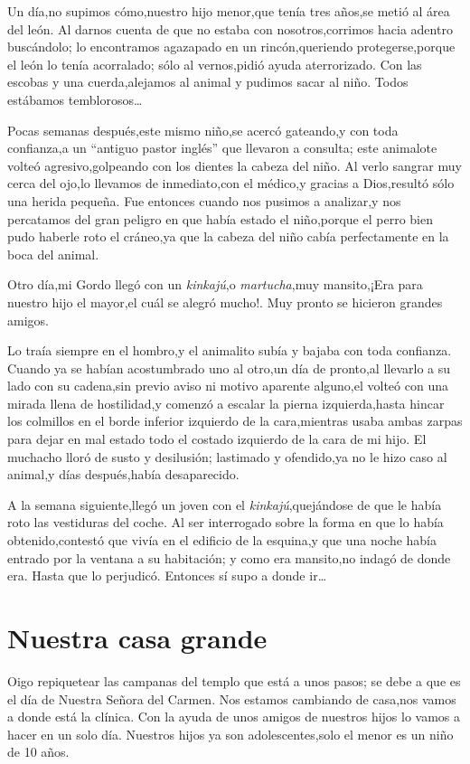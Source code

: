 \documentclass[letterpaper,12pt]{book}
\begin{document}
Un día,no supimos cómo,nuestro hijo menor,que tenía tres años,se metió al área del león. Al darnos cuenta de que no estaba con nosotros,corrimos hacia adentro buscándolo; lo encontramos agazapado en un rincón,queriendo protegerse,porque el león lo tenía acorralado; sólo al vernos,pidió ayuda aterrorizado. Con las escobas y una cuerda,alejamos al animal y pudimos sacar al niño. Todos estábamos temblorosos\ldots

Pocas semanas después,este mismo niño,se acercó gateando,y con toda confianza,a un ``antiguo pastor inglés'' que llevaron a consulta; este animalote volteó agresivo,golpeando con los dientes la cabeza del niño. Al verlo sangrar muy cerca del ojo,lo llevamos de inmediato,con el médico,y gracias a Dios,resultó sólo una herida pequeña. Fue entonces cuando nos pusimos a analizar,y nos percatamos del gran peligro en que había estado el niño,porque el perro bien pudo haberle roto el cráneo,ya que la cabeza del niño cabía perfectamente en la boca del animal.

Otro día,mi Gordo llegó con un \textit{kinkajú},o \textit{martucha},muy mansito,¡Era para nuestro hijo el mayor,el cuál se alegró mucho!. Muy pronto se hicieron grandes amigos.

Lo traía siempre en el hombro,y el animalito subía y bajaba con toda confianza. Cuando ya se habían acostumbrado uno al otro,un día de pronto,al llevarlo a su lado con su cadena,sin previo aviso ni motivo aparente alguno,el volteó con una mirada llena de hostilidad,y comenzó a escalar la pierna izquierda,hasta hincar los colmillos en el borde inferior izquierdo de la cara,mientras usaba ambas zarpas para dejar en mal estado todo el costado izquierdo de la cara de mi hijo. El muchacho lloró de susto y desilusión; lastimado y ofendido,ya no le hizo caso al animal,y días después,había desaparecido.

A la semana siguiente,llegó un joven con el \textit{kinkajú},quejándose de que le había roto las vestiduras del coche. Al ser interrogado sobre la forma en que lo había obtenido,contestó que vivía en el edificio de la esquina,y que una noche había entrado por la ventana a su habitación; y como era mansito,no indagó de donde era. Hasta que lo perjudicó. Entonces sí supo a donde ir\ldots

\chapter{Nuestra casa grande}
Oigo repiquetear las campanas del templo que está a unos pasos; se debe a que es el día de Nuestra Señora del Carmen. Nos estamos cambiando de casa,nos vamos a donde está la clínica. Con la ayuda de unos amigos de nuestros hijos lo vamos a hacer en un solo día. Nuestros hijos ya son adolescentes,solo el menor es un niño de 10 años. 
\end{document}
